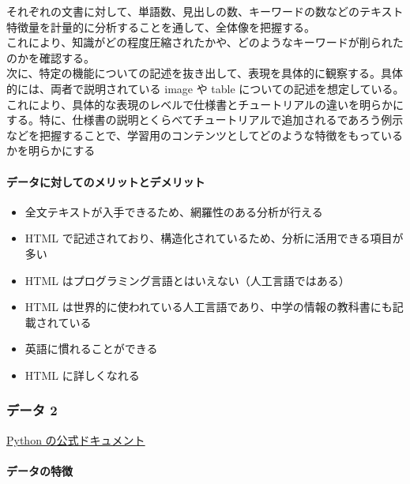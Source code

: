それぞれの文書に対して、単語数、見出しの数、キーワードの数などのテキスト特徴量を計量的に分析することを通して、全体像を把握する。\\
これにより、知識がどの程度圧縮されたかや、どのようなキーワードが削られたのかを確認する。\\
次に、特定の機能についての記述を抜き出して、表現を具体的に観察する。具体的には、両者で説明されている
image や table についての記述を想定している。\\
これにより、具体的な表現のレベルで仕様書とチュートリアルの違いを明らかにする。特に、仕様書の説明とくらべてチュートリアルで追加されるであろう例示などを把握することで、学習用のコンテンツとしてどのような特徴をもっているかを明らかにする

\hypertarget{ux30c7ux30fcux30bfux306bux5bfeux3057ux3066ux306eux30e1ux30eaux30c3ux30c8ux3068ux30c7ux30e1ux30eaux30c3ux30c8-1}{%
\paragraph{データに対してのメリットとデメリット}\label{ux30c7ux30fcux30bfux306bux5bfeux3057ux3066ux306eux30e1ux30eaux30c3ux30c8ux3068ux30c7ux30e1ux30eaux30c3ux30c8-1}}

\begin{itemize}
\tightlist
\item
  全文テキストが入手できるため、網羅性のある分析が行える
\item
  HTML
  で記述されており、構造化されているため、分析に活用できる項目が多い
\item
  HTML はプログラミング言語とはいえない（人工言語ではある）
\item
  HTML
  は世界的に使われている人工言語であり、中学の情報の教科書にも記載されている
\item
  英語に慣れることができる
\item
  HTML に詳しくなれる
\end{itemize}

\hypertarget{ux30c7ux30fcux30bf-2}{%
\subsubsection{データ 2}\label{ux30c7ux30fcux30bf-2}}

\href{https://docs.python.org/3/}{Python の公式ドキュメント}

\hypertarget{ux30c7ux30fcux30bfux306eux7279ux5fb4-2}{%
\paragraph{データの特徴}\label{ux30c7ux30fcux30bfux306eux7279ux5fb4-2}}

